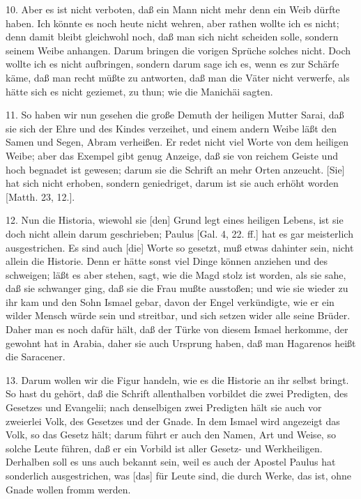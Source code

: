 10. Aber es ist nicht verboten, daß ein Mann nicht mehr denn ein Weib dürfte haben. Ich könnte es noch heute nicht wehren, aber rathen wollte ich es nicht; denn damit bleibt gleichwohl noch, daß man sich nicht scheiden solle, sondern seinem Weibe anhangen. Darum bringen die vorigen Sprüche solches nicht. Doch wollte ich es nicht aufbringen, sondern darum sage ich es, wenn es zur Schärfe käme, daß man recht müßte zu antworten, daß man die Väter nicht verwerfe, als hätte sich es nicht geziemet, zu thun; wie die Manichäi sagten.

11. So haben wir nun gesehen die große Demuth der heiligen Mutter Sarai, daß sie sich der Ehre und des Kindes verzeihet, und einem andern Weibe läßt den Samen und Segen, Abram verheißen. Er redet nicht viel Worte von dem heiligen Weibe; aber das Exempel gibt genug Anzeige, daß sie von reichem Geiste und hoch begnadet ist gewesen; darum sie die Schrift an mehr Orten anzeucht. [Sie] hat sich nicht erhoben, sondern geniedriget, darum ist sie auch erhöht worden [Matth. 23, 12.].

12. Nun die Historia, wiewohl sie [den] Grund legt eines heiligen Lebens, ist sie doch nicht allein darum geschrieben; Paulus [Gal. 4, 22. ff.] hat es gar meisterlich ausgestrichen. Es sind auch [die] Worte so gesetzt, muß etwas dahinter sein, nicht allein die Historie. Denn er hätte sonst viel Dinge können anziehen und des schweigen; läßt es aber stehen, sagt, wie die Magd stolz ist worden, als sie sahe, daß sie schwanger ging, daß sie die Frau mußte ausstoßen; und wie sie wieder zu ihr kam und den Sohn Ismael gebar, davon der Engel verkündigte, wie er ein wilder Mensch würde sein und streitbar, und sich setzen wider alle seine Brüder. Daher man es noch dafür hält, daß der Türke von diesem Ismael herkomme, der gewohnt hat in Arabia, daher sie auch Ursprung haben, daß man Hagarenos heißt die Saracener.

13. Darum wollen wir die Figur handeln, wie es die Historie an ihr selbst bringt. So hast du gehört, daß die Schrift allenthalben vorbildet die zwei Predigten, des Gesetzes und Evangelii; nach denselbigen zwei Predigten hält sie auch vor zweierlei Volk, des Gesetzes und der Gnade. In dem Ismael wird angezeigt das Volk, so das Gesetz hält; darum führt er auch den Namen, Art und Weise, so solche Leute führen, daß er ein Vorbild ist aller Gesetz- und Werkheiligen. Derhalben soll es uns auch bekannt sein, weil es auch der Apostel Paulus hat sonderlich ausgestrichen, was [das] für Leute sind, die durch Werke, das ist, ohne Gnade wollen fromm werden.

